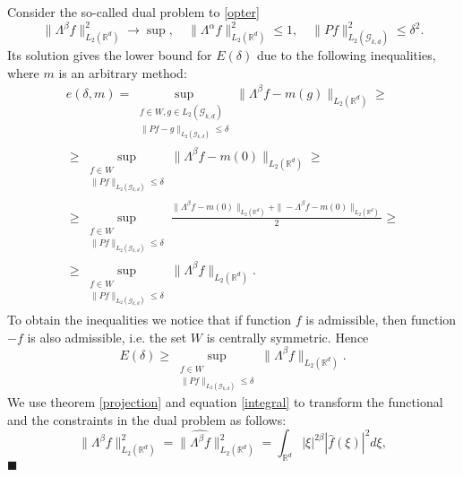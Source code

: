 \documentclass[12pt]{iopart}
\newenvironment{proof}
{\par\noindent{\bf Proof}}
{\hfill$\scriptstyle\blacksquare$}
\begin{document}
	\begin{proof}
		Consider the so-called dual problem to \eqref{opter}
		\[
		\|\Lambda^\beta f\|^2_{L_2(\mathbb R^d)}\to\sup,\quad \|
		\Lambda^\alpha f\|^2_{L_2(\mathbb R^d)}\leqslant  1,\quad
		\|Pf\|^2_{L_2(\mathcal G_{k,d})}\leqslant  \delta^2.
		\]
		Its solution gives the lower bound for $E(\delta)$ due to the following inequalities, where $m$ is an arbitrary method:
		\begin{multline*}
		e(\delta,m)= \sup_{
			\begin{smallmatrix}
			f\in W, g\in L_2(\mathcal G_{k,d})\\ 
			\|Pf-g\|_{L_2(\mathcal G_{k,d})}\leqslant \delta
			\end{smallmatrix}}
		\|\Lambda^\beta f-m(g)\|_{L_2(\mathbb{R}^d)}\geqslant\\
		\geqslant\sup_{
			\begin{smallmatrix}
			f\in W\\ 
			\|Pf\|_{L_2(\mathcal G_{k,d})}\leqslant \delta
			\end{smallmatrix}}
		\|\Lambda^\beta f-m(0)\|_{L_2(\mathbb{R}^d)}\geqslant \\
		\geqslant \sup_{
			\begin{smallmatrix}
			f\in W\\ 
			\|Pf\|_{L_2(\mathcal G_{k,d})}\leqslant \delta
			\end{smallmatrix}}
		\frac{\|\Lambda^\beta f-m(0)\|_{L_2(\mathbb{R}^d)}+\|-\Lambda^\beta f-m(0)\|_{L_2(\mathbb{R}^d)}}{2}\geqslant \\
		\geqslant\sup_{
			\begin{smallmatrix}
			f\in W\\ 
			\|Pf\|_{L_2(\mathcal G_{k,d})}\leqslant \delta
			\end{smallmatrix}}
		\|\Lambda^\beta f\|_{L_2(\mathbb{R}^d)}.
		\end{multline*}
		To obtain the inequalities we notice that if function $f$ is admissible, then function $-f$ is also admissible, i.e. the set $W$ is centrally symmetric. Hence
		$$E(\delta)\geqslant\sup_{
			\begin{smallmatrix}
			f\in W\\ 
			\|Pf\|_{L_2(\mathcal G_{k,d})}\leqslant \delta
			\end{smallmatrix}}
		\|\Lambda^\beta f\|_{L_2(\mathbb{R}^d)}.$$
		We use theorem \ref{projection} and equation \eqref{integral} to transform the functional and the constraints in the dual problem as follows: 
		\[
		\|\Lambda^\beta f\|^2_{L_2(\mathbb R^d)}=\|\widehat{\Lambda^\beta f}\|^2_{L_2(\mathbb R^d)}=\int_{\mathbb R^d}|\xi|^{2\beta}|\widehat{f}(\xi )|^2d\xi,
\]
\end{proof}
\end{document}
